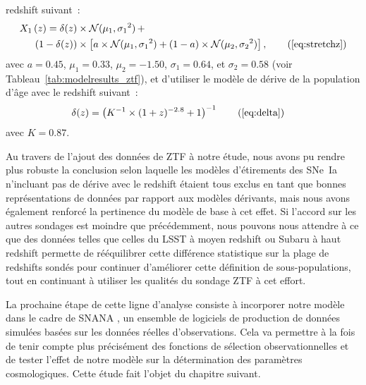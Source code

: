 \documentclass[../main/main.tex]{subfiles}
\begin{document}
\begin{enumerate}
        redshift suivant~:
        \begin{align*}
        \label{eqconclusion:stretchz}
            X_1\left(z \right) =
            \delta(z)&\times\mathcal{N}(\mu_1,\sigma_1{}^2)\,+\nonumber\\
            (1-\delta(z))&\times \left[a\times\mathcal{N}(\mu_1,\sigma_1{}^2) +
            (1-a)\times\mathcal{N}(\mu_2,\sigma_2{}^2)\right],
            \tag{\ref{eq:stretchz}}
        \end{align*}
        avec $a=0.45$, $\mu_1=0.33$, $\mu_2=-1.50$, $\sigma_1=0.64$, et
        $\sigma_2=0.58$ (voir Tableau~\ref{tab:modelresults_ztf}), et d'utiliser
        le modèle de dérive de la population d'âge avec le redshift suivant~:
        \begin{align*}
            \delta(z) & = \left( K^{-1} \times (1+z)^{-2.8} +1 \right)^{-1}
            \tag{\ref{eq:delta}}
        \end{align*}
        avec $K=0.87$.
\end{enumerate}

Au travers de l'ajout des données de ZTF à notre étude, nous avons pu rendre
plus robuste la conclusion selon laquelle les modèles d'étirements des SNe~Ia
n'incluant pas de dérive avec le redshift étaient tous exclus en tant que bonnes
représentations de données par rapport aux modèles dérivants, mais nous avons
également renforcé la pertinence du modèle de base à cet effet. Si l'accord sur
les autres sondages est moindre que précédemment, nous pouvons nous attendre à
ce que des données telles que celles du LSST à moyen redshift ou Subaru à haut
redshift permette de rééquilibrer cette différence statistique sur la plage de
redshifts sondés pour continuer d'améliorer cette définition de
sous-populations, tout en continuant à utiliser les qualités du sondage ZTF à
cet effort.

La prochaine étape de cette ligne d'analyse consiste à incorporer notre modèle
dans le cadre de SNANA \citep{kessler2009a}, un ensemble de logiciels de
production de données simulées basées sur les données réelles d'observations.
Cela va permettre à la fois de tenir compte plus
précisément des fonctions de sélection observationnelles et de tester l'effet
de notre modèle sur la détermination des paramètres cosmologiques. Cette étude
fait l'objet du chapitre suivant.

\clearpage

\thispagestyle{plain}
\vfill
\minilof
\vfill
\minilot
\vfill

% 
% 
\end{document}
